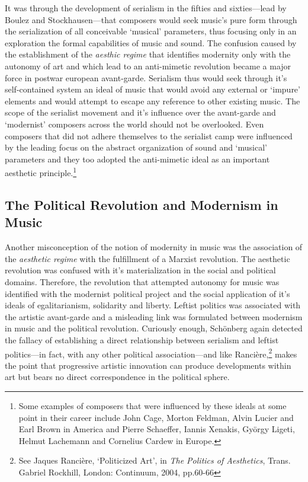 It was through the development of serialism in the fifties and sixties---lead by Boulez and Stockhausen---that composers would seek music's pure form through the serialization of all conceivable `musical' parameters, thus focusing only in an exploration the formal capabilities of music and sound. The confusion caused by the establishment of the \emph{aesthic regime} that identifies modernity only with the autonomy of art and which lead to an anti-mimetic revolution became a major force in postwar european avant-garde. Serialism thus would seek through it's self-contained system an ideal of music that would avoid any external or `impure' elements and would attempt to escape any reference to other existing music. The scope of the serialist movement and it's influence over the avant-garde and `modernist' composers across the world should not be overlooked. Even composers that did not adhere themselves to the serialist camp were influenced by the leading focus on the abstract organization of sound and `musical' parameters and they too adopted the anti-mimetic ideal as an important aesthetic principle.\footnote{Some examples of composers that were influenced by these ideals at some point in their career include John Cage, Morton Feldman, Alvin Lucier and Earl Brown in America and Pierre Schaeffer, Iannis Xenakis, Gy\"{o}rgy Ligeti, Helmut Lachemann and Cornelius Cardew in Europe.}

\subsection{The Political Revolution and Modernism in Music}

Another misconception of the notion of modernity in music was the association of the \emph{aesthetic regime} with the fulfillment of a Marxist revolution. The aesthetic revolution was confused with it's materialization in the social and political domains. Therefore, the revolution that attempted autonomy for music was identified with the modernist political project and the social application of it's ideals of egalitarianism, solidarity and liberty.
Leftist politics was associated with the artistic avant-garde and a misleading link was formulated between modernism in music and the political revolution. Curiously enough, Sch\"{o}nberg again detected the fallacy of establishing a direct relationship between serialism and leftist politics---in fact, with any other political association---and like Ranci\`{e}re,\footnote{See Jaques Ranci\`{e}re, `Politicized Art', in \emph{The Politics of Aesthetics}, Trans. Gabriel Rockhill, London: Continuum, 2004, pp.60-66} makes the point that progressive artistic innovation can produce developments within art but bears no direct correspondence in the political sphere.

